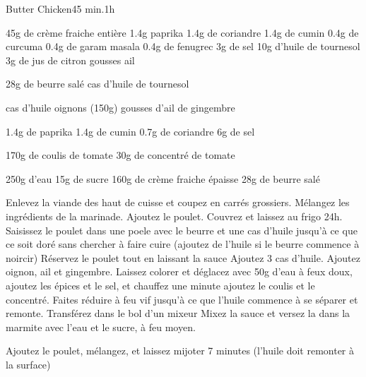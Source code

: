 {\begin{recette}{Butter Chicken}{}{45 min.}{1h}
\begin{ingredients}
\ingredient 45g de crème fraiche entière
\ingredient 1.4g paprika
\ingredient 1.4g de coriandre
\ingredient 1.4g de cumin
\ingredient 0.4g de curcuma
\ingredient 0.4g de garam masala
\ingredient 0.4g de fenugrec
\ingredient 3g de sel
\ingredient 10g d'huile de tournesol
\ingredient 3g de jus de citron
 gousses ail

\ingredient 28g de beurre salé
 cas d'huile de tournesol

\ingredient[oignon]
 cas d'huile
 oignons (150g)
 gousses d'ail
\ingredient 2.5cm de gingembre

\ingredient[épices]
\ingredient 1.4g de paprika
\ingredient 1.4g de cumin
\ingredient 0.7g de coriandre
\ingredient 6g de sel

\ingredient 170g de coulis de tomate
\ingredient 30g de concentré de tomate

\ingredient[Mixage]
\ingredient 250g d'eau
\ingredient 15g de sucre
\ingredient 160g de crème fraiche épaisse
\ingredient 28g de beurre salé

\end{ingredients}

\begin{preparation}
\etape Enlevez la viande des haut de cuisse et coupez en carrés grossiers. 
\etape Mélangez les ingrédients de la marinade. Ajoutez le poulet. 
\etape [optionnel] Couvrez et laissez au frigo 24h. 
\etape Saisissez le poulet dans une poele avec le beurre et une cas d'huile jusqu'à ce que ce soit doré sans chercher à faire cuire (ajoutez de l'huile si le beurre commence à noircir)
\etape Réservez le poulet tout en laissant la sauce
\etape Ajoutez 3 cas d'huile. Ajoutez oignon, ail et gingembre. Laissez colorer et déglacez avec 50g d'eau
\etape à feux doux, ajoutez les épices et le sel, et chauffez une minute
\etape ajoutez le coulis et le concentré. Faites réduire à feu vif jusqu'à ce que l'huile commence à se séparer et remonte. Transférez dans le bol d'un mixeur
\etape Mixez la sauce et versez la dans la marmite avec l'eau et le sucre, à feu moyen. 
\end{preparation}

\begin{cuisson}
Ajoutez le poulet, mélangez, et laissez mijoter 7 minutes (l'huile doit remonter à la surface)


\end{cuisson}
\end{recette}}
